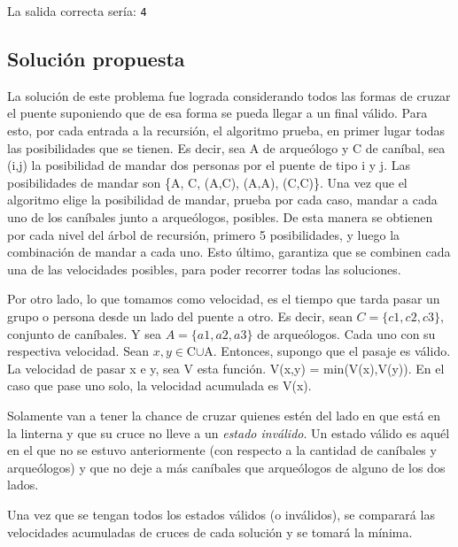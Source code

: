         La salida correcta sería: \newline
        \texttt{4}

    \subsection{Solución propuesta}
        La solución de este problema fue lograda considerando todos las formas de cruzar el puente suponiendo que de esa forma se pueda llegar a un final válido. Para esto, por cada entrada a la recursión, el algoritmo prueba, en primer lugar todas las posibilidades que se tienen. Es decir, sea A de arqueólogo y C de caníbal, sea (i,j) la posibilidad de mandar dos personas por el puente de tipo i y j. Las posibilidades de mandar son \{A, C, (A,C), (A,A), (C,C)\}. Una vez que el algoritmo elige la posibilidad de mandar, prueba por cada caso, mandar a cada uno de los caníbales junto a arqueólogos, posibles. De esta manera se obtienen por cada nivel del árbol de recursión, primero 5 posibilidades, y luego la combinación de mandar a cada uno. Esto último, garantiza que se combinen cada una de las velocidades posibles, para poder recorrer todas las soluciones.\PAR

        Por otro lado, lo que tomamos como velocidad, es el tiempo que tarda pasar un grupo o persona desde un lado del puente a otro. Es decir, 
        sean $C =\{c1,c2,c3\}$, conjunto de caníbales. Y sea $A =\{a1,a2,a3\}$ de arqueólogos. Cada uno con su respectiva velocidad.
        Sean $x,y\in$C$\cup$A. Entonces, supongo que el pasaje es válido.
        La velocidad de pasar x e y, sea V esta función. V(x,y) = min(V(x),V(y)). En el caso que pase uno solo, la velocidad acumulada es V(x).

        Solamente van a tener la chance de cruzar quienes estén del lado en que está en la linterna y que su cruce no lleve a un \emph{estado inválido}. Un estado válido es aquél en el que no se estuvo anteriormente (con respecto a la cantidad de caníbales y arqueólogos) y que no deje a más caníbales que arqueólogos de alguno de los dos lados. 

        Una vez que se tengan todos los estados válidos (o inválidos), se comparará las velocidades acumuladas de cruces de cada solución y se tomará la mínima.

